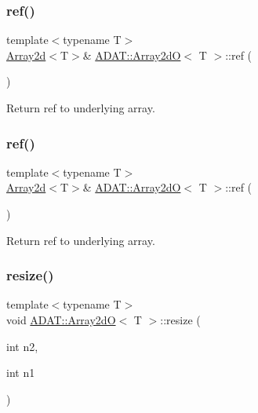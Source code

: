 \subsubsection{\texorpdfstring{ref()}{ref()}\hspace{0.1cm}{\footnotesize\ttfamily [3/4]}}
{\footnotesize\ttfamily template$<$typename T$>$ \\
\mbox{\hyperlink{classXMLArray_1_1Array2d}{Array2d}}$<$T$>$\& \mbox{\hyperlink{classADAT_1_1Array2dO}{A\+D\+A\+T\+::\+Array2dO}}$<$ T $>$\+::ref (\begin{DoxyParamCaption}{ }\end{DoxyParamCaption})\hspace{0.3cm}{\ttfamily [inline]}}



Return ref to underlying array. 

\mbox{\label{classADAT_1_1Array2dO_aa409325aa8f61b6f9a6aeeca2746b4cb}} 
\subsubsection{\texorpdfstring{ref()}{ref()}\hspace{0.1cm}{\footnotesize\ttfamily [4/4]}}
{\footnotesize\ttfamily template$<$typename T$>$ \\
\mbox{\hyperlink{classXMLArray_1_1Array2d}{Array2d}}$<$T$>$\& \mbox{\hyperlink{classADAT_1_1Array2dO}{A\+D\+A\+T\+::\+Array2dO}}$<$ T $>$\+::ref (\begin{DoxyParamCaption}{ }\end{DoxyParamCaption})\hspace{0.3cm}{\ttfamily [inline]}}



Return ref to underlying array. 

\mbox{\label{classADAT_1_1Array2dO_abccbac468c29e2d8a24b9cd317e92247}} 
\subsubsection{\texorpdfstring{resize()}{resize()}\hspace{0.1cm}{\footnotesize\ttfamily [1/4]}}
{\footnotesize\ttfamily template$<$typename T$>$ \\
void \mbox{\hyperlink{classADAT_1_1Array2dO}{A\+D\+A\+T\+::\+Array2dO}}$<$ T $>$\+::resize (\begin{DoxyParamCaption}\item[{int}]{n2,  }\item[{int}]{n1 }\end{DoxyParamCaption})\hspace{0.3cm}{\ttfamily [inline]}}

